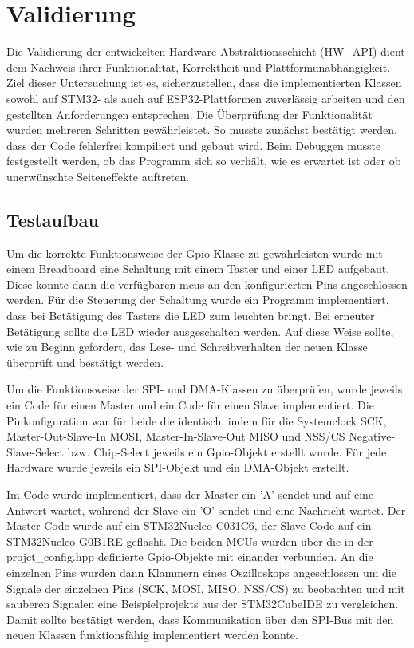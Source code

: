 \section{Validierung}
Die Validierung der entwickelten Hardware-Abstraktionsschicht (HW\_API) dient dem Nachweis ihrer Funktionalität, Korrektheit und Plattformunabhängigkeit. 
Ziel dieser Untersuchung ist es, sicherzustellen, dass die implementierten Klassen sowohl auf STM32- als auch auf ESP32-Plattformen zuverlässig arbeiten und den gestellten Anforderungen entsprechen.
Die Überprüfung der Funktionalität wurden mehreren Schritten gewährleistet.
So musste zunächst bestätigt werden, dass der Code fehlerfrei kompiliert und gebaut wird.
Beim Debuggen musste festgestellt werden, ob das Programm sich so verhält, wie es erwartet ist oder ob unerwünschte Seiteneffekte auftreten.

\subsection{Testaufbau}
Um die korrekte Funktionsweise der Gpio-Klasse zu gewährleisten wurde mit einem Breadboard eine Schaltung mit einem Taster und einer LED aufgebaut.
Diese konnte dann die verfügbaren \gls{mcu}s an den konfigurierten Pins angeschlossen werden.
Für die Steuerung der Schaltung wurde ein Programm implementiert, dass bei Betätigung des Tasters die LED zum leuchten bringt. 
Bei erneuter Betätigung sollte die LED wieder ausgeschalten werden.
Auf diese Weise sollte, wie zu Beginn gefordert, das Lese- und Schreibverhalten der neuen Klasse überprüft und bestätigt werden.

Um die Funktionsweise der SPI- und DMA-Klassen zu überprüfen, wurde jeweils ein Code für einen Master und ein Code für einen Slave implementiert.
Die Pinkonfiguration war für beide die identisch, indem für die Systemclock SCK, Master-Out-Slave-In MOSI, Master-In-Slave-Out MISO und NSS/CS Negative-Slave-Select bzw. Chip-Select jeweils ein Gpio-Objekt erstellt wurde.
Für jede Hardware wurde jeweils ein SPI-Objekt und ein DMA-Objekt erstellt.

Im Code wurde implementiert, dass der Master ein 'A' sendet und auf eine Antwort wartet, während der Slave ein 'O' sendet und eine Nachricht wartet.
Der Master-Code wurde auf ein STM32Nucleo-C031C6, der Slave-Code auf ein STM32Nucleo-G0B1RE geflasht. 
Die beiden MCUs wurden über die in der projct\_config.hpp definierte Gpio-Objekte mit einander verbunden.
An die einzelnen Pins wurden dann Klammern eines Oszilloskops angeschlossen um die Signale der einzelnen Pins (SCK, MOSI, MISO, NSS/CS) zu beobachten und mit sauberen Signalen eine Beispielprojekts aus der STM32CubeIDE zu vergleichen.
Damit sollte bestätigt werden, dass Kommunikation über den SPI-Bus mit den neuen Klassen funktionsfähig implementiert werden konnte. 

